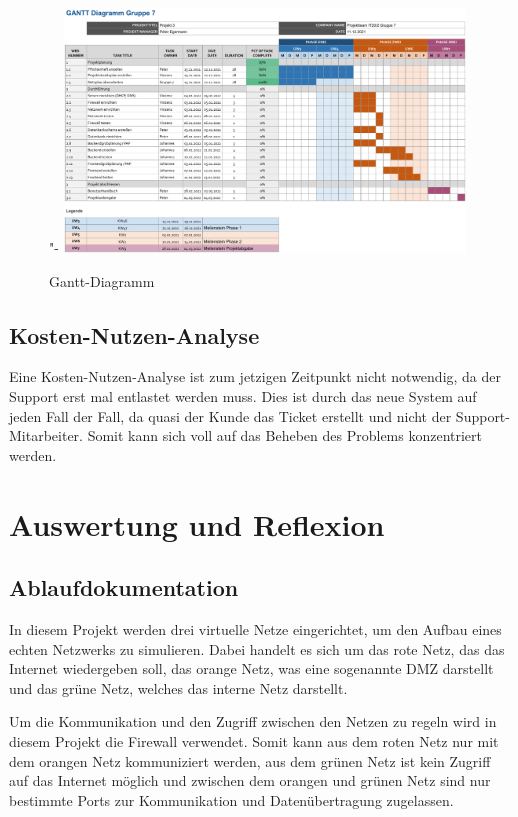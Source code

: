 \documentclass[a4paper,
    11pt,
    headings=small,
    ngerman,
    listof=totoc,
    numbers=noenddot]{scrreprt}[2021/11/13]
\begin{document}
\begin{figure}[htbp]"-
  \centering
  \includegraphics[width=0.95\textwidth]{data/Gantt.png}
  \caption{Gantt-Diagramm}
  \label{fig:GanttKlein}
\end{figure}



\section{Kosten-Nutzen-Analyse}

Eine Kosten-Nutzen-Analyse ist zum jetzigen Zeitpunkt nicht notwendig, da der Support erst mal entlastet werden muss. Dies ist durch das neue System auf jeden Fall der Fall, da quasi der Kunde das Ticket erstellt und nicht der Support-Mitarbeiter. Somit kann sich voll auf das Beheben des Problems konzentriert werden.




\chapter{Auswertung und Reflexion}



\section{Ablaufdokumentation}

In diesem Projekt werden drei virtuelle Netze eingerichtet, um den Aufbau eines echten Netzwerks zu simulieren. Dabei handelt es sich um das rote Netz, das das Internet wiedergeben soll, das orange Netz, was eine sogenannte \ac{DMZ} darstellt und das grüne Netz, welches das interne Netz darstellt.

Um die Kommunikation und den Zugriff zwischen den Netzen zu regeln wird in diesem Projekt die Firewall verwendet. Somit kann aus dem roten Netz nur mit dem orangen Netz kommuniziert werden, aus dem grünen Netz ist kein Zugriff auf das Internet möglich und zwischen dem orangen und grünen Netz sind nur bestimmte Ports zur Kommunikation und Datenübertragung zugelassen.
\end{document}

